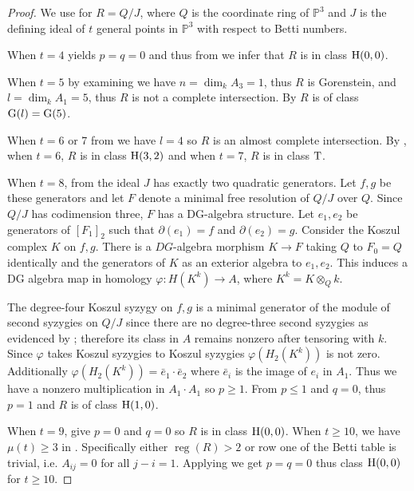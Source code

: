 \documentclass[reqno]{amsart}
\DeclareMathOperator{\rank}{dim}
\DeclareMathOperator{\reg}{reg}
\renewcommand{\phi}{\varphi}
\renewcommand{\P}{\mathbb{P}}
\renewcommand{\H}{{\rm H}}
\newcommand{\G}{{\rm G}}
\newcommand{\T}{{\rm T}}
\theoremstyle{plain} %
\theoremstyle{definition}
\theoremstyle{remark}
\begin{document}
\begin{proof}
We use  for $R=Q/J$, where $Q$ is the coordinate ring of $\P^3$ and $J$ is the defining ideal of $t$ general points in $\P^3$ with respect to Betti numbers. 



When $t=4$  yields $p=q=0$ and thus from   we infer that $R$ is in class $\H(0,0)$. 


When $t=5$ by examining  we have $n=\rank_kA_3=1$, thus $R$ is Gorenstein, and ${l}=\rank_kA_1=5$, 
thus $R$ is not a complete intersection. By \cite[1.4.2.]{Avramov} $R$ is of class $\G({l})=\G(5)$. 


When $t=6$ or 7 from  we have ${l}=4 $ 
so $R$ is an almost complete intersection. By
, when $t=6$, $R$ is in class $\H(3,2)$ and when $t=7$, $R$ is in class $\T$. 


When $t=8$, from  the ideal $J$ has exactly two quadratic generators. Let $f, g$ be these generators and let $F$ denote a minimal free resolution of $Q/J$ over $Q$. Since $Q/J$ has codimension three, $F$ has a DG-algebra structure. Let $e_1,e_2$ be generators of $[F_1]_2$ such that $\partial(e_1)=f$ and $\partial(e_2)=g$. Consider the Koszul complex $K$ on $f,g$. There is a $DG$-algebra morphism $K\to F$ taking $Q$ to $F_0=Q$ identically and the generators of $K$ as an exterior algebra to $e_1, e_2$. This induces a DG algebra map in homology $\phi:H(K^k)\to A$, where $K^k=K\otimes_{Q}k$.

 The degree-four Koszul syzygy on $f,g$ is a minimal generator of the module of second syzygies on $Q/J$ since there are no degree-three second syzygies as evidenced by ; therefore its class in $A$ remains nonzero after tensoring with $k$. Since $\phi$ takes Koszul syzygies to Koszul syzygies $\phi(H_2(K^k))$ is not zero. Additionally $\phi(H_2(K^k))=\bar e_1\cdot \bar e_2$ where $\bar e_i$ is the image of $e_i$ in $A_1$. Thus we have a nonzero multiplication in $A_1\cdot A_1$ so $p\geq 1$. From  $p\leq 1$ and $q= 0$, thus $p=1$ and $R$ is of class $\H(1,0)$. 
 
 When $t=9$,  give $p=0$ and $q=0$ so $R$ is in class $\H(0,0)$. When $t\geq 10$, we have $\mu(t)\geq 3$ in . Specifically either $\reg(R)>2$ or row one of the Betti table is trivial, i.e. $A_{ij}=0$ for all $j-i=1$. Applying  we get $p=q=0$ thus class $\H(0,0)$ for $t\geq 10$.
 \end{proof}
\end{document}
